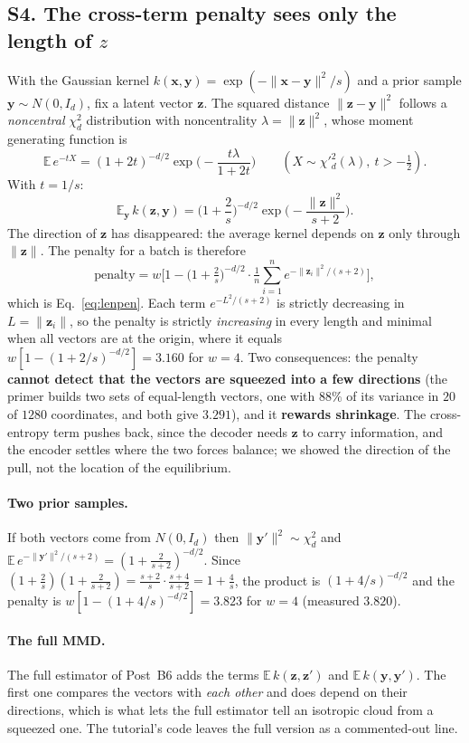 \documentclass[11pt]{article}
\newcommand{\E}{\mathbb{E}}
\begin{document}
\subsection*{S4. The cross-term penalty sees only the length of $z$}
With the Gaussian kernel $k(\bm x,\bm y)=\exp(-\lVert\bm x-\bm y\rVert^2/s)$ and a prior sample $\bm y\sim N(0,I_d)$, fix a latent vector $\bm z$. The squared distance $\lVert\bm z-\bm y\rVert^2$ follows a \emph{noncentral} $\chi^2_d$ distribution with noncentrality $\lambda=\lVert\bm z\rVert^2$, whose moment generating function is
\[
  \E\,e^{-tX}=(1+2t)^{-d/2}\exp\!\Big(-\frac{t\lambda}{1+2t}\Big)\qquad(X\sim\chi'^2_d(\lambda),\ t>-\tfrac12).
\]
With $t=1/s$:
\begin{equation}
  \E_{\bm y}\,k(\bm z,\bm y)=\Big(1+\frac2s\Big)^{-d/2}\exp\!\Big(-\frac{\lVert\bm z\rVert^2}{s+2}\Big).
\end{equation}
The direction of $\bm z$ has disappeared: the average kernel depends on $\bm z$ only through $\lVert\bm z\rVert$. The penalty for a batch is therefore
\[
  \text{penalty}=w\Big[1-\Big(1+\tfrac2s\Big)^{-d/2}\cdot\tfrac1n\sum_{i=1}^n e^{-\lVert\bm z_i\rVert^2/(s+2)}\Big],
\]
which is Eq.~\eqref{eq:lenpen}. Each term $e^{-L^2/(s+2)}$ is strictly decreasing in $L=\lVert\bm z_i\rVert$, so the penalty is strictly \emph{increasing} in every length and minimal when all vectors are at the origin, where it equals $w[1-(1+2/s)^{-d/2}]=3.160$ for $w=4$. Two consequences: the penalty \textbf{cannot detect that the vectors are squeezed into a few directions} (the primer builds two sets of equal-length vectors, one with $88\%$ of its variance in $20$ of $1280$ coordinates, and both give $3.291$), and it \textbf{rewards shrinkage}. The cross-entropy term pushes back, since the decoder needs $\bm z$ to carry information, and the encoder settles where the two forces balance; we showed the direction of the pull, not the location of the equilibrium.

\paragraph{Two prior samples.} If both vectors come from $N(0,I_d)$ then $\lVert\bm y'\rVert^2\sim\chi^2_d$ and $\E\,e^{-\lVert\bm y'\rVert^2/(s+2)}=(1+\tfrac{2}{s+2})^{-d/2}$. Since $(1+\tfrac2s)(1+\tfrac2{s+2})=\tfrac{s+2}{s}\cdot\tfrac{s+4}{s+2}=1+\tfrac4s$, the product is $(1+4/s)^{-d/2}$ and the penalty is $w[1-(1+4/s)^{-d/2}]=3.823$ for $w=4$ (measured $3.820$).

\paragraph{The full MMD.} The full estimator of Post~B6 adds the terms $\E\,k(\bm z,\bm z')$ and $\E\,k(\bm y,\bm y')$. The first one compares the vectors with \emph{each other} and does depend on their directions, which is what lets the full estimator tell an isotropic cloud from a squeezed one. The tutorial's code leaves the full version as a commented-out line.
\end{document}
